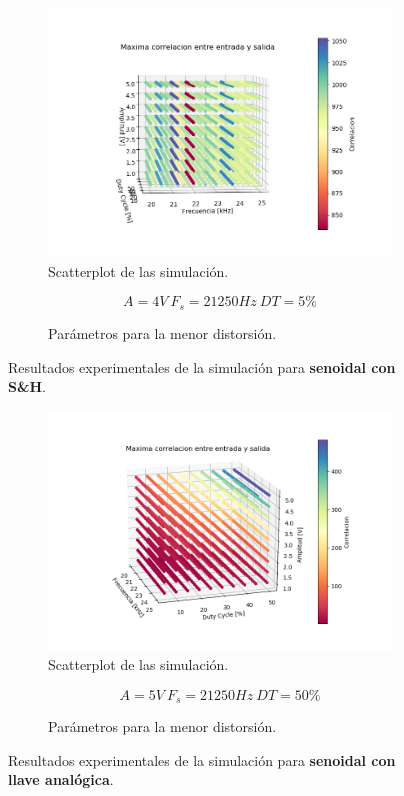 \begin{figure}[H]
\centering
\begin{subfigure}{\linewidth}
\includegraphics[width=\linewidth]{ImagenesEjercicio6/scatter_sh_seno.png}
\caption{Scatterplot de las simulación.}
\end{subfigure}

\begin{subfigure}{\linewidth}
\[A = 4V \ F_s = 21250Hz \ DT = 5\%\]
\caption{Parámetros para la menor distorsión.}
\end{subfigure}
\label{seno_sh}
\caption{Resultados experimentales de la simulación para \textbf{senoidal con S\&H}.}
\end{figure}

\begin{figure}[H]
\centering
\begin{subfigure}{\linewidth}
\includegraphics[width=\linewidth]{ImagenesEjercicio6/scatter_llave_seno.png}
\caption{Scatterplot de las simulación.}
\end{subfigure}

\begin{subfigure}{\linewidth}
\[A = 5V \ F_s = 21250Hz \ DT = 50\%\]
\caption{Parámetros para la menor distorsión.}
\end{subfigure}
\label{seno_llave}
\caption{Resultados experimentales de la simulación para \textbf{senoidal con llave analógica}.}
\end{figure}

